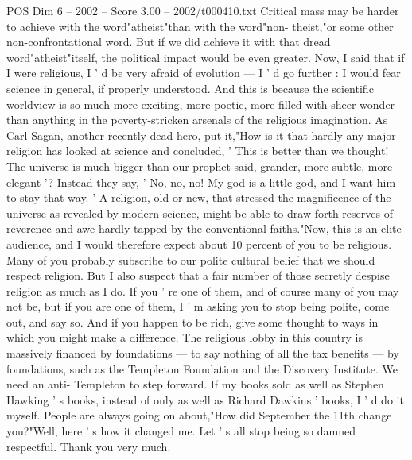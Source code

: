 \begin{textsample}{POS Dim 6 – 2002 – Score 3.00 – 2002/t000410.txt}
Critical mass may be harder to achieve with the word"atheist"than with the word"non- theist,"or some other non-confrontational word.
But if we did achieve it with that dread word"atheist"itself, the political impact would be even greater.
Now, I said that if I were religious, I ' d be very afraid of evolution — I ' d go further : I would fear science in general, if properly understood.
And this is because the scientific worldview is so much more exciting, more poetic, more filled with sheer wonder than anything in the poverty-stricken arsenals of the religious imagination.
As Carl Sagan, another recently dead hero, put it,"How is it that hardly any major religion has looked at science and concluded, ' This is better than we thought!
The universe is much bigger than our prophet said, grander, more subtle, more elegant '?
Instead they say, ' No, no, no!
My god is a little god, and I want him to stay that way. ' A religion, old or new, that stressed the magnificence of the universe as revealed by modern science, might be able to draw forth reserves of reverence and awe hardly tapped by the conventional faiths."Now, this is an elite audience, and I would therefore expect about 10 percent of you to be religious.
Many of you probably subscribe to our polite cultural belief that we should respect religion.
But I also suspect that a fair number of those secretly despise religion as much as I do.
If you ' re one of them, and of course many of you may not be, but if you are one of them, I ' m asking you to stop being polite, come out, and say so.
And if you happen to be rich, give some thought to ways in which you might make a difference.
The religious lobby in this country is massively financed by foundations — to say nothing of all the tax benefits — by foundations, such as the Templeton Foundation and the Discovery Institute.
We need an anti- Templeton to step forward.
If my books sold as well as Stephen Hawking ' s books, instead of only as well as Richard Dawkins ' books, I ' d do it myself.
People are always going on about,"How did September the 11th change you?"Well, here ' s how it changed me.
Let ' s all stop being so damned respectful.
Thank you very much.

\end{textsample}
